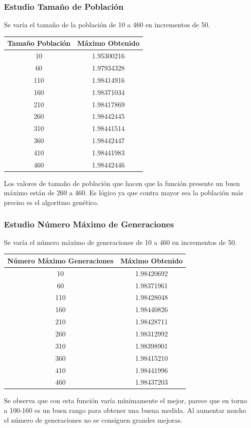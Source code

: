 \documentclass[12pt]{article}
\begin{document}
\subsubsection*{Estudio Tamaño de Población}
	Se varía el tamaño de la población de 10 a 460 en incrementos de 50.
\begin{table}[H]
\begin{center}
\begin{tabular}{|cc|} \hline
Tamaño Población & Máximo Obtenido \\  \hline
10  & 1.95300216 \\ 
60  & 1.97934328 \\ 
110 & 1.98414916 \\
160 & 1.98371034 \\
210 & 1.98417869 \\
260 & 1.98442445 \\
310 & 1.98441514 \\
360 & 1.98442447 \\ 
410 & 1.98441983 \\
460 & 1.98442446 \\  \hline
\end{tabular}
\end{center}
\end{table}
	Los valores de tamaño de población que hacen que la función presente un buen máximo están de 260 a 460. Es lógico ya que contra mayor sea la población más preciso es el algoritmo genético.   

\subsubsection*{Estudio Número Máximo de Generaciones}
	Se varía el número máximo de generaciones de 10 a 460 en incrementos de 50.
\begin{table}[H]
\begin{center}
\begin{tabular}{|cc|} \hline
Número Máximo Generaciones & Máximo Obtenido \\  \hline
10  & 1.98420692 \\ 
60  & 1.98371961 \\ 
110 & 1.98428048 \\
160 & 1.98440826 \\
210 & 1.98428711 \\
260 & 1.98312992 \\
310 & 1.98398901 \\
360 & 1.98415210 \\ 
410 & 1.98441996 \\
460 & 1.98437203 \\  \hline
\end{tabular}
\end{center}
\end{table}
	Se observa que con esta función varía mínimamente el mejor, parece que en torno a 100-160 es un buen rango para obtener una buena medida. Al aumentar mucho el número de generaciones no se consiguen grandes mejoras.
\end{document}
